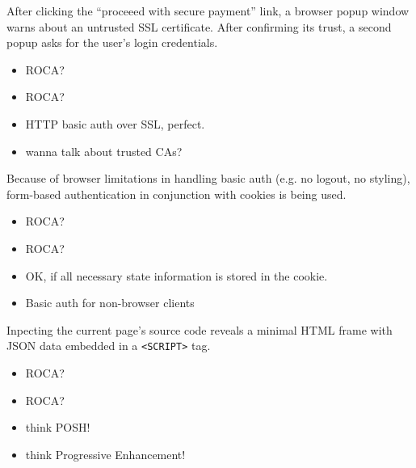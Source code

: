 \documentclass{beamer}
\newcommand{\rocaok}{\ding{51}}
\newcommand{\rocafail}{\ding{55}}
\begin{document}
\begin{frame}
  After clicking the ``proceeed with secure payment'' link, a browser popup window
  warns about an untrusted SSL certificate. After confirming its trust, a second
  popup asks for the user's login credentials.

  \vspace{0.3cm}
  \begin{itemize}
    \item<1|only@1>[\Large $\square$] \Large ROCA?
    \item<2|only@2>[\Large \rocaok] \Large ROCA?
    \item<2> HTTP basic auth over SSL, perfect.
    \item<2> wanna talk about trusted CAs?
  \end{itemize}

\end{frame}

\begin{frame}
  Because of browser limitations in handling basic auth (e.g. no logout, no styling),
  form-based authentication in conjunction with cookies is being used.

  \vspace{0.3cm}
  \begin{itemize}
    \item<1|only@1>[\Large $\square$] \Large ROCA?
    \item<2|only@2>[\Large \rocaok] \Large ROCA?
    \item<2> OK, if all necessary state information is stored in the cookie.
    \item<2> Basic auth for non-browser clients
  \end{itemize}

\end{frame}

\begin{frame}
  Inpecting the current page's source code reveals a minimal HTML frame with
  JSON data embedded in a \texttt{<SCRIPT>} tag.

  \vspace{0.3cm}
  \begin{itemize}
    \item<1|only@1>[\Large $\square$] \Large ROCA?
    \item<2|only@2>[\Large \rocafail] \Large ROCA?
    \item<2> think POSH!
    \item<2> think Progressive Enhancement!
  \end{itemize}

\end{frame}
\end{document}
